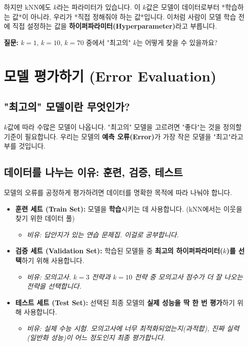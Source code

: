 \documentclass[11pt,a4paper]{book}
\theoremstyle{definition}
\begin{document}
하지만 kNN에도 $k$라는 파라미터가 있습니다.
이 $k$값은 모델이 데이터로부터 *학습하는 값*이 아니라, 우리가 *직접 정해줘야 하는 값*입니다.
이처럼 사람이 모델 학습 전에 직접 설정하는 값을 \textbf{하이퍼파라미터(Hyperparameter)}라고 부릅니다.

\textbf{질문:} $k=1$, $k=10$, $k=70$ 중에서 "최고의" $k$는 어떻게 찾을 수 있을까요?


\section{모델 평가하기 (Error Evaluation)}

\subsection{"최고의" 모델이란 무엇인가?}

$k$값에 따라 수많은 모델이 나옵니다. "최고의" 모델을 고르려면 "좋다"는 것을 정의할 기준이 필요합니다.
우리는 모델의 \textbf{예측 오류(Error)}가 가장 작은 모델을 "최고"라고 부를 것입니다.

\subsection{데이터를 나누는 이유: 훈련, 검증, 테스트}

모델의 오류를 공정하게 평가하려면 데이터를 명확한 목적에 따라 나눠야 합니다.

\begin{analogybox}[title={시험 공부 비유}]
\begin{itemize}
    \item \textbf{훈련 세트 (Train Set):} 모델을 \textbf{학습}시키는 데 사용합니다. (kNN에서는 이웃을 찾기 위한 데이터 풀)
        \begin{itemize}
            \item \textit{비유: 답안지가 있는 연습 문제집. 이걸로 공부합니다.}
        \end{itemize}
    \item \textbf{검증 세트 (Validation Set):} 학습된 모델들 중 \textbf{최고의 하이퍼파라미터($k$)를 선택}하기 위해 사용합니다.
        \begin{itemize}
            \item \textit{비유: 모의고사. $k=3$ 전략과 $k=10$ 전략 중 모의고사 점수가 더 잘 나오는 전략을 선택합니다.}
        \end{itemize}
    \item \textbf{테스트 세트 (Test Set):} 선택된 최종 모델의 \textbf{실제 성능을 딱 한 번 평가}하기 위해 사용합니다.
        \begin{itemize}
            \item \textit{비유: 실제 수능 시험. 모의고사에 너무 최적화되었는지(과적합), 진짜 실력(일반화 성능)이 어느 정도인지 최종 평가합니다.}
        \end{itemize}
\end{itemize}
\end{analogybox}
\end{document}
